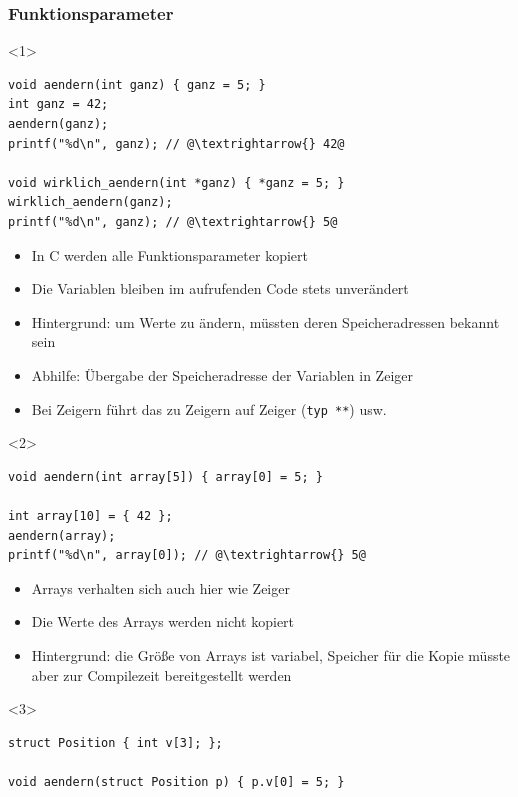 \documentclass{slides}
\begin{document}
\begin{frame}[fragile]
  \frametitle{Funktionsparameter}

  \begin{onlyenv}<1>
\begin{lstlisting}
void aendern(int ganz) { ganz = 5; }
int ganz = 42;
aendern(ganz);
printf("%d\n", ganz); // @\textrightarrow{} 42@

void wirklich_aendern(int *ganz) { *ganz = 5; }
wirklich_aendern(ganz);
printf("%d\n", ganz); // @\textrightarrow{} 5@
\end{lstlisting}

    \begin{itemize}
    \item In C werden alle Funktionsparameter kopiert
    \item Die Variablen bleiben im aufrufenden Code stets unverändert
    \item Hintergrund: um Werte zu ändern, müssten deren Speicheradressen bekannt sein
    \item Abhilfe: Übergabe der Speicheradresse der Variablen in Zeiger
    \item Bei Zeigern führt das zu Zeigern auf Zeiger (\lstinline!typ **!) usw.
    \end{itemize}
  \end{onlyenv}

  \begin{onlyenv}<2>
\begin{lstlisting}
void aendern(int array[5]) { array[0] = 5; }

int array[10] = { 42 };
aendern(array);
printf("%d\n", array[0]); // @\textrightarrow{} 5@
\end{lstlisting}

    \begin{itemize}
    \item Arrays verhalten sich auch hier wie Zeiger
    \item Die Werte des Arrays werden nicht kopiert
    \item Hintergrund: die Größe von Arrays ist variabel, Speicher für die Kopie müsste aber zur
      Compilezeit bereitgestellt werden
    \end{itemize}
  \end{onlyenv}
  
  \begin{onlyenv}<3>
\begin{lstlisting}
struct Position { int v[3]; };

void aendern(struct Position p) { p.v[0] = 5; }


\end{lstlisting}
\end{onlyenv}
\end{frame}
\end{document}
